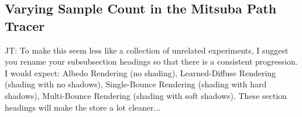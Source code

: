 \documentclass[10pt,twocolumn,letterpaper]{article}
\newcommand{\tompson}[1]{{\color{green} JT: #1}}
\begin{document}
\subsection{Varying Sample Count in the Mitsuba Path Tracer}

\tompson{To make this seem less like a collection of unrelated experiments, I suggest you rename your subsubsection headings so that there is a consistent progression. I would expect: Albedo Rendering (no shading), Learned-Diffuse Rendering (shading with no shadows), Single-Bounce Rendering (shading with hard shadows), Multi-Bounce Rendering (shading with soft shadows).  These section headings will make the store a lot cleaner...}
\end{document}

